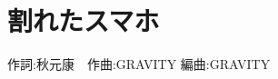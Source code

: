 \section{割れたスマホ}

\begin{center}
    \scriptsize{
        作詞:秋元康　作曲:GRAVITY	編曲:GRAVITY
    }
\end{center}

\vspace{0.7em}

\begin{Parallel}[c]{0.47\textwidth}{0.47\textwidth}

\ParallelLText{
    \footnotesize{
        
    }
}

\ParallelRText{
    \footnotesize{
        
    }
}

\end{Parallel}
